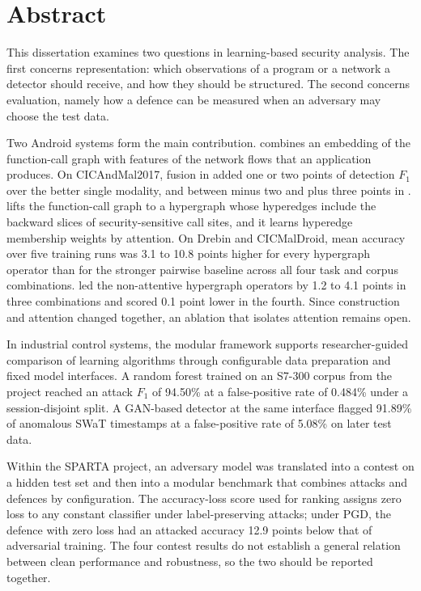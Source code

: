 \chapter*{Abstract}

This dissertation examines two questions in learning-based security analysis. The first concerns
representation: which observations of a program or a network a detector should receive, and how
they should be structured. The second concerns evaluation, namely how a defence can be measured
when an adversary may choose the test data.

Two Android systems form the main contribution. \hybroid{} combines an embedding of the
function-call graph with \netfeatures{} features of the network flows that an application
produces. On CICAndMal2017, fusion in \hybroid{} added one or two points of detection $F_1$ over the
better single modality, and between minus two and plus three points in \categoryclassification{}.
\hgann{} lifts the function-call graph to a hypergraph whose hyperedges include the backward
slices of security-sensitive call sites, and it learns hyperedge membership weights by attention.
On Drebin and CICMalDroid, mean accuracy over five training runs was 3.1 to 10.8 points higher
for every hypergraph operator than for the stronger pairwise baseline across all four task
and corpus combinations. \hgann{} led the
non-attentive hypergraph operators by 1.2 to 4.1 points in three combinations and scored 0.1
point lower in the fourth. Since
construction and attention changed together, an ablation that isolates attention remains open.

In industrial control systems, the modular framework \nadics{} supports researcher-guided
comparison of learning algorithms through configurable data preparation and fixed model
interfaces. A random forest trained on an S7-300 corpus from the \iuno{}
project reached an attack $F_1$ of 94.50\% at a false-positive rate of 0.484\%
under a session-disjoint split. A GAN-based detector at the same interface flagged 91.89\%
of anomalous SWaT timestamps at a false-positive rate of 5.08\% on later test data.

Within the SPARTA project, an adversary model was translated into a contest on a hidden test set
and then into a modular benchmark that combines attacks and defences by configuration. The
accuracy-loss score used for ranking assigns zero loss to any constant classifier under
label-preserving attacks; under PGD, the defence with zero loss had an attacked accuracy 12.9
points below that of adversarial training. The four contest results do not establish a general relation
between clean performance and robustness, so the two should be reported together.

